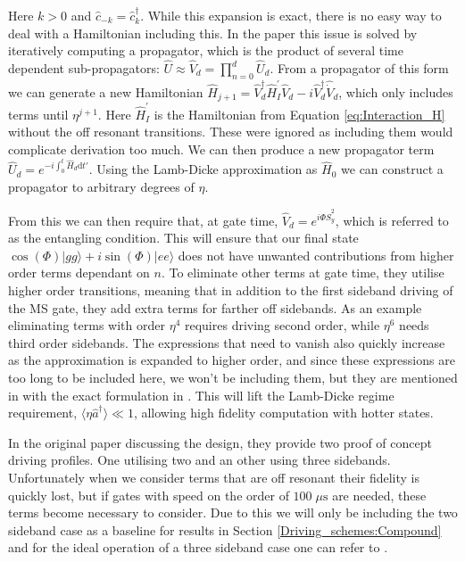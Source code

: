 \documentclass[12pt,twoside]{report}
\begin{document}
Here $k > 0$ and $\hat{c}_{-k} = \hat{c}_k^\dagger$. While this expansion is exact, there is no easy way to deal with a Hamiltonian including this. In the paper this issue is solved by iteratively computing a propagator, which is the product of several time dependent sub-propagators: $\hat{U} \approx \hat{V}_d = \prod_{n=0}^{d}\hat{U}_d$. From a propagator of this form we can generate a new Hamiltonian ${\hat{H}_{j+1} = \hat{V}_d^\dagger \hat{H}_I^{'} \hat{V}_d - i\hat{V}_d^\dagger\hat{\dot{V}}_d}$, which only includes terms until $\eta^{j+1}$. Here $\hat{H}_I^{'}$ is the Hamiltonian from Equation \eqref{eq:Interaction_H} without the off resonant transitions. These were ignored as including them would complicate derivation too much. We can then produce a new propagator term $\hat{U}_d = e^{-i\int_{0}^{t}\hat{H}_d\text{d}t'}$. Using the Lamb-Dicke approximation as $\hat{H}_0$ we can construct a propagator to arbitrary degrees of $\eta$\cite{SC_Paper}.

From this we can then require that, at gate time, $\hat{V}_d=e^{i\Phi\hat{S}_y^2}$, which is referred to as the entangling condition. This will ensure that our final state ${\cos\left(\Phi\right)|gg\rangle + i\sin\left(\Phi\right)|ee\rangle}$ does not have unwanted contributions from higher order terms dependant on $n$. To eliminate other terms at gate time, they utilise higher order transitions, meaning that in addition to the first sideband driving of the MS gate, they add extra terms for farther off sidebands. As an example eliminating terms with order $\eta^4$ requires driving second order, while $\eta^6$ needs third order sidebands. The expressions that need to vanish also quickly increase as the approximation is expanded to higher order, and since these expressions are too long to be included here, we won't be including them, but they are mentioned in \cite{SC_Paper} with the exact formulation in \cite{SC_github}. This will lift the Lamb-Dicke regime requirement, $\langle\eta\hat{a}^{\dagger}\rangle\ll 1$, allowing high fidelity computation with hotter states.

In the original paper discussing the design, they provide two proof of concept driving profiles. One utilising two and an other using three sidebands. Unfortunately when we consider terms that are off resonant their fidelity is quickly lost, but if gates with speed on the order of $100\;\mu\text{s}$ are needed, these terms become necessary to consider. Due to this we will only be including the two sideband case as a baseline for results in Section \ref{Driving_schemes:Compound} and for the ideal operation of a three sideband case one can refer to \cite{SC_Paper}.
\end{document}
